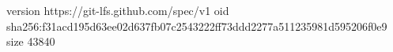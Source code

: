 version https://git-lfs.github.com/spec/v1
oid sha256:f31acd195d63ee02d637fb07c2543222ff73ddd2277a511235981d595206f0e9
size 43840

